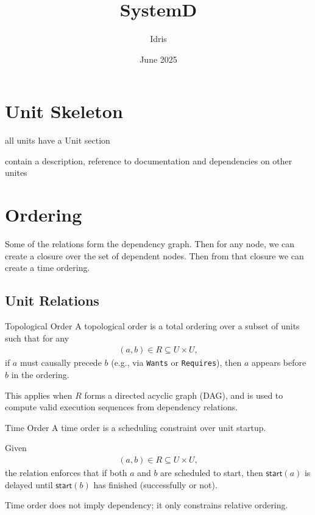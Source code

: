 \documentclass[openany, 12pt]{book}
\title{SystemD}
\author{Idris}
\date{June 2025}
\begin{document}
\tableofcontents
\listoftodos

\chapter{Unit Skeleton}
\begin{alist}
	\item all units have a Unit section
	\item contain a description, reference to documentation and dependencies on
	other unites
\end{alist}

\chapter{Ordering}

Some of the relations form the dependency graph. Then for any node, we can
create a closure over the set of dependent nodes. Then from that closure we can
create a time ordering.

\section{Unit Relations}

\begin{definition}{Topological Order}{}
	A topological order is a total ordering over a subset of units such that for
	any
	\begin{align*}
		(a, b) \in R \subseteq U \times U,
	\end{align*}
	if $a$ must causally precede $b$ (e.g., via \texttt{Wants} or \texttt{Requires}),
	then $a$ appears before $b$ in the ordering.

	This applies when $R$ forms a directed acyclic graph (DAG), and is used to
	compute valid execution sequences from dependency relations.
\end{definition}

\begin{definition}{Time Order}{}
	A time order is a scheduling constraint over unit startup.

	Given
	\begin{align*}
		(a, b) \in R \subseteq U \times U,
	\end{align*}
	the relation enforces that if both $a$ and $b$ are scheduled to start, then
	$\mathsf{start}(a)$ is delayed until $\mathsf{start}(b)$ has finished
	(successfully or not).

	Time order does not imply dependency; it only constrains relative ordering.
\end{definition}
\end{document}
